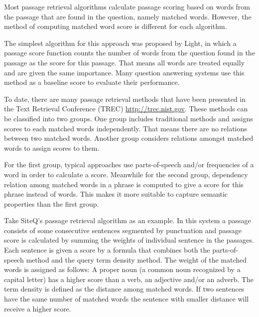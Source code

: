Most passage retrieval algorithms calculate passage scoring based on words from the passage that are found in the question, namely matched words. However, the method of computing matched word score is different for each algorithm. 

The simplest algorithm for this approach was proposed by Light\cite{light2002aec}, in which a passage score function counts the number of words from the question found in the passage as the score for this passage. That means all words are treated equally and are given the same importance. Many question answering systems use this method as a baseline score to evaluate their performance. 

To date, there are many passage retrieval methods that have been presented in the Text Retrieval Conference (TREC) \url{http://trec.nist.gov}. These methods can be classified into two groups. One group includes traditional methods and assigns scores to each matched words independently. That means there are no relations between two matched words. Another group  considers relations amongst matched words to assign scores to them. 

For the first group, typical approaches use parts-of-speech and/or frequencies of a word in order to calculate a score. Meanwhile for the second group, dependency relation among matched words in a phrase is computed to give a score for this phrase instead of words. This makes it more suitable to capture semantic properties than the first group.

Take SiteQ's passage retrieval algorithm \cite{lee2002seh} as an example. In this system a passage consists of some consecutive sentences segmented by punctuation and passage score is calculated by summing the weights of individual sentence in the passages. Each sentence is given a score by a formula that combines both the parts-of-speech method and the query term density method. The weight of the matched words is assigned as follows: A proper noun (a common noun recognized by a capital letter) has a higher score than a verb, an adjective and/or an adverb. The term density is defined as the distance among matched words. If two sentences have the same number of matched words the sentence with smaller distance will receive a higher score.

